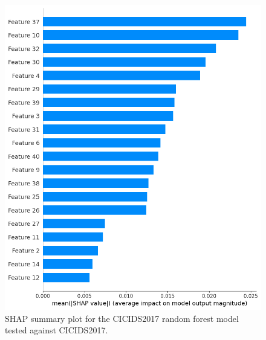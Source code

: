 \begin{figure}[H]
    \centering
    \includegraphics[width=1\textwidth]{img/SHAP_RFCICIDS2017_CICIDS2017.png}
    \caption{SHAP summary plot for the CICIDS2017 random forest model tested against CICIDS2017.}\label{fig:shap_rfc_cicids2017_cicids2017}
\end{figure}

